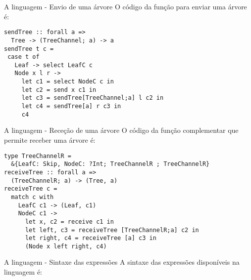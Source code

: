 \begin{frame}[fragile]{A linguagem - Envio de uma árvore}
  O código da função para enviar uma árvore é:
    \vskip 0.5cm
  \begin{lstlisting}
sendTree :: forall a =>
  Tree -> (TreeChannel; a) -> a
sendTree t c =
 case t of
   Leaf -> select LeafC c
   Node x l r ->
     let c1 = select NodeC c in
     let c2 = send x c1 in
     let c3 = sendTree[TreeChannel;a] l c2 in
     let c4 = sendTree[a] r c3 in
     c4

\end{lstlisting}
\end{frame}

\begin{frame}[fragile]{A linguagem - Receção de uma árvore}
  O código da função complementar que permite receber uma árvore é:
  \vskip 0.5cm
  \begin{lstlisting}
type TreeChannelR =
  &{LeafC: Skip, NodeC: ?Int; TreeChannelR ; TreeChannelR}
receiveTree :: forall a =>
  (TreeChannelR; a) -> (Tree, a)
receiveTree c =
  match c with
    LeafC c1 -> (Leaf, c1)
    NodeC c1 ->
      let x, c2 = receive c1 in
      let left, c3 = receiveTree [TreeChannelR;a] c2 in
      let right, c4 = receiveTree [a] c3 in
      (Node x left right, c4)
\end{lstlisting}
\end{frame}

\begin{frame}[fragile, shrink=20]{A linguagem - Sintaxe das expressões}
  \vskip 1cm
  A sintaxe das expressões disponíveis na linguagem é:
  
\end{frame}


